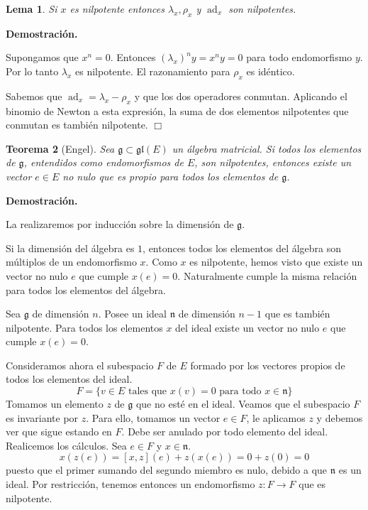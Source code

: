 \documentclass[a4paper,draft,12pt]{scrartcl}
\newtheorem{teo}{Teorema}[section]%
\newtheorem{lema}[teo]{Lema}%
\newcommand{\dem}{\noindent \textbf{Demostración. }\vspace{0.3 cm}}%
\newcommand{\g}{\mathfrak{g}}%
\newcommand{\fin}{ $\Box $ \vspace{0.4 cm}}
\DeclareMathOperator{\ad}{ad}  %
\begin{document}
\begin{lema}

Si $x$ es nilpotente entonces $\lambda_x, \rho_x$ y $ \ad_x$ son nilpotentes.

\end{lema}

\dem

Supongamos que $x^n=0$.  Entonces $(\lambda_x)^ny = x^ny =0$ para todo endomorfismo $y$.  Por lo tanto $\lambda_x$ es nilpotente.  El razonamiento para $\rho_x$ es idéntico.

Sabemos que $\ad_x = \lambda_x-\rho_x$ y que los dos operadores conmutan.  Aplicando el binomio de Newton a esta expresión, la suma de dos elementos nilpotentes que conmutan es también nilpotente. \fin

\begin{teo}[Engel]

Sea $\g \subset \mathfrak{gl}(E)$ un álgebra matricial.  Si todos los elementos de $\g$, entendidos como endomorfismos de $E$, son nilpotentes, entonces existe un vector $e  \in E$ no nulo que es propio para todos los elementos de $\g$.

\end{teo}


\dem

La realizaremos por inducción sobre la dimensión de $\g$.

Si la dimensión del álgebra es $1$, entonces todos los elementos del álgebra son múltiplos de un endomorfismo $x$.  Como $x$ es nilpotente, hemos visto que existe un vector no nulo $e$ que cumple $x(e)=0$.  Naturalmente cumple la misma relación para todos los elementos del álgebra.

Sea $\g$ de dimensión $n$.  Posee un ideal $\mathfrak{n}$ de dimensión $n-1$ que es también nilpotente.  Para todos los elementos $x$ del ideal existe un vector no nulo $e$ que cumple $x(e)=0$.  

Consideramos ahora el subespacio $F$ de $E$ formado por los vectores propios de todos los elementos del ideal.
$$
F= \{v \in E \text{ tales que } x(v)=0 \text{ para todo } x \in \mathfrak{n}\}
$$
Tomamos un elemento $z$ de $\g$ que no esté en el ideal.  Veamos que el subespacio $F$ es invariante por $z$.  Para ello, tomamos un vector $e \in F$, le aplicamos $z$ y debemos ver que sigue estando en $F$.  Debe ser  anulado por todo elemento del ideal.  Realicemos los cálculos.  Sea $e\in F$ y $x \in\mathfrak{n}$.
$$
x(z(e))=[x,z](e)+ z(x(e))=0+z(0)=0
$$
puesto que el primer sumando del segundo miembro es nulo, debido a  que $\mathfrak{n}$ es un ideal. Por restricción,  tenemos entonces un endomorfismo $z: F \rightarrow F$ que es nilpotente.
\end{document}
